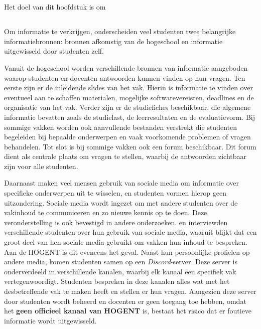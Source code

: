 \chapter{}%
\label{ch:literatuurstudie}

\section{}%
\label{sec:state-of-the-art}

Het doel van dit hoofdstuk is om 

\section{}%
\label{sec:state-of-the-art}

Om informatie te verkrijgen, onderscheiden veel studenten twee belangrijke informatiebronnen: bronnen afkomstig van de hogeschool en informatie uitgewisseld door studenten zelf.

Vanuit de hogeschool worden verschillende bro\-nnen van informatie aangeboden waarop studenten en docenten antwoorden kunnen vinden op hun vragen. Ten eerste zijn er de inleidende slides van het vak. Hierin is informatie te vinden over eventueel aan te schaffen materialen, mogelijke softwarevereisten, deadlines en de organisatie van het vak. Verder zijn er de studiefiches beschikbaar, die algemene informatie bevatten zoals de studielast, de leerresultaten en de evaluatievorm. Bij sommige vakken worden ook aanvullende bestanden verstrekt die studenten begeleiden bij bepaalde onderwerpen en vaak voorkomende problemen of vragen behandelen. Tot slot is bij sommige vakken ook een forum beschikbaar. Dit forum dient als centrale plaats om vragen te stellen, waarbij de antwoorden zichtbaar zijn voor alle studenten.

Daarnaast maken veel mensen gebruik van sociale media om informatie over specifieke onderwerpen uit te wisselen, en studenten vormen hierop geen uitzondering. Sociale media wordt ingezet om met andere studenten over de vakinhoud te communiceren en zo nieuwe kennis op te doen. Deze veronderstelling is ook bevestigd in andere onderzoeken. \textcite{M.Talaue2018} en \textcite{Bal2017} interviewden verschillende studenten over hun gebruik van sociale media, waaruit blijkt dat een groot deel van hen sociale media gebruikt om vakken hun inhoud te bespreken. Aan de HOGENT is dit eveneens het geval. Naast hun persoonlijke profielen op andere media, komen studenten samen op een \textit{Discord}-server. Deze server is onderverdeeld in verschillende kanalen, waarbij elk kanaal een specifiek vak vertegenwoordigt. Studenten bespreken in deze kanalen alles wat met het desbetreffende vak te maken heeft en stellen er hun vragen. Aangezien deze server door studenten wordt beheerd en docenten er geen toegang toe hebben, omdat het \textbf{geen officieel kanaal van HOGENT} is, bestaat het risico dat er foutieve informatie wordt uitgewisseld. 

